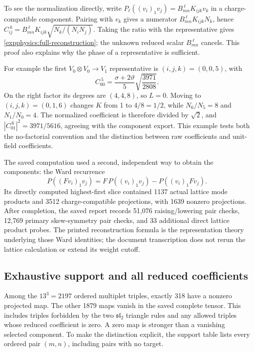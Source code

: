 To see the normalization directly, write
$P_\ell((v_i)_1v_j)=B_{mn}^{\ \ell}K_{ijk}v_k$ in a
charge-compatible component. Pairing with $v_k$ gives a numerator
$B_{mn}^{\ \ell}K_{ijk}N_k$, hence
$C_{ij}^{\ k}=B_{mn}^{\ \ell}K_{ijk}\sqrt{N_k/(N_iN_j)}$.
Taking the ratio with the representative gives
\eqref{expphysics:full-reconstruction}; the unknown reduced scalar
$B_{mn}^{\ \ell}$ cancels. This proof also explains why the phase
of a representative is sufficient.

For example the first $V_0\otimes V_0\to V_1$ representative is
$(i,j,k)=(0,0,5)$, with
\[
 C_{00}^{\ 5}=\frac{\sigma+2\vartheta}{5}
                  \sqrt{\frac{3971}{2808}}.
\]
On the right factor its degrees are $(4,4,8)$, so $L=0$.
Moving to $(i,j,k)=(0,1,6)$ changes $K$ from 1 to $4/8=1/2$,
while $N_6/N_5=8$ and $N_1/N_0=4$. The normalized coefficient is
therefore divided by $\sqrt2$, and
$|C_{01}^{\ 6}|^2=3971/5616$, agreeing with the component export.
This example tests both the no-factorial convention and the
distinction between raw coefficients and unit-field coefficients.

The saved computation used a second, independent way to obtain
the components: the Ward recurrence
\[
 P((Fv_i)_1v_j)=F\,P((v_i)_1v_j)-P((v_i)_1Fv_j).
\]
Its directly computed highest-first slice contained 1137 actual
lattice mode products and 3512 charge-compatible projections,
with 1639 nonzero projections. After completion, the saved report
records 51,076 raising/lowering pair checks, 12,769 primary
skew-symmetry pair checks, and 33 additional direct lattice product
probes. The printed reconstruction formula is the representation
theory underlying those Ward identities; the document transcription
does not rerun the lattice calculation or extend its weight cutoff.

\subsection{Exhaustive support and all reduced coefficients}
\label{expphysics:atlas-coverage}

Among the $13^3=2197$ ordered multiplet triples, exactly 318 have
a nonzero projected map. The other 1879 maps vanish in the saved
complete tensor. This includes triples forbidden by the two
$\mathfrak{sl}_2$ triangle rules and any allowed triples whose reduced
coefficient is zero. A zero map is stronger than a vanishing selected
component. To make the distinction explicit, the support table lists
every ordered pair $(m,n)$, including pairs with no target.

